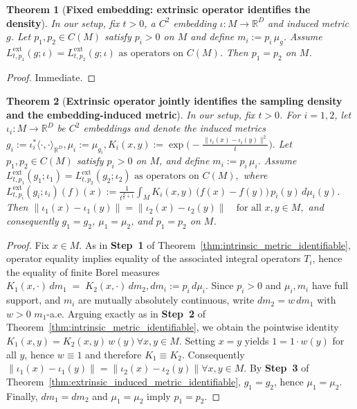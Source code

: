 \documentclass{amsart}
\newtheorem{theorem}{Theorem}[section]
\theoremstyle{definition}
\theoremstyle{remark}
\newcommand{\0}{\boldsymbol{0}}
\begin{document}
\begin{theorem}[\textbf{Fixed embedding: extrinsic operator identifies the density}]
\label{thm:extrinsic_fixed_embedding_identifies_density}
In our setup, fix $t>0$, a $C^2$ embedding $\iota:M\to\mathbb{R}^{D}$ and induced metric $g$.
Let $p_1,p_2\in C(M)$ satisfy $p_i>0$ on $M$ and define $m_i:=p_i\,\mu_g$.
Assume
\(
L^{\mathrm{ext}}_{t,p_1}(g;\iota)=L^{\mathrm{ext}}_{t,p_2}(g;\iota)
\text{ as operators on }C(M)
\). Then $p_1=p_2$ on $M$.
\end{theorem}

\begin{proof}
Immediate.
\end{proof}



\begin{theorem}[\textbf{Extrinsic operator jointly identifies the sampling density and the embedding-induced metric}]
\label{thm:extrinsic_joint_identifies_metric_and_density}
In our setup, fix $t>0$. For $i=1,2$, let $\iota_i:M\to\mathbb{R}^{D}$ be $C^2$ embeddings and denote the induced metrics
\(
g_i:=\iota_i^*\langle\cdot,\cdot\rangle_{\mathbb{R}^{D}},
 \mu_i:=\mu_{g_i},
 K_i(x,y):=\exp\!\Big(-\frac{\|\iota_i(x)-\iota_i(y)\|^2}{t}\Big).
\)
Let $p_1,p_2\in C(M)$ satisfy $p_i>0$ on $M$, and define $m_i:=p_i\,\mu_i$.
Assume
\(
L^{\mathrm{ext}}_{t,p_1}(g_1;\iota_1)=L^{\mathrm{ext}}_{t,p_2}(g_2;\iota_2)
\text{ as operators on }C(M),
\)
where
\(
L^{\mathrm{ext}}_{t,p_i}(g_i;\iota_i)(f)(x)
:=\frac{1}{t^{\frac d2+1}}\int_M K_i(x,y)\,\bigl(f(x)-f(y)\bigr)\,p_i(y)\,d\mu_i(y).
\)
Then
\(
\|\iota_1(x)-\iota_1(y)\|=\|\iota_2(x)-\iota_2(y)\|
\quad\text{for all }x,y\in M,
\)
and consequently $g_1=g_2$, $\mu_1=\mu_2$, and $p_1=p_2$ on $M$.
\end{theorem}

\begin{proof}
Fix $x\in M$. As in \textbf{Step~1} of Theorem~\ref{thm:intrinsic_metric_identifiable}, operator equality implies equality of the associated
integral operators $T_i$, hence the equality of finite Borel measures
\(
K_1(x,\cdot)\,dm_1 \;=\; K_2(x,\cdot)\,dm_2,
 dm_i:=p_i\,d\mu_i .
\)
Since $p_i>0$ and $\mu_i, m_i$ have full support, and $m_i$ are mutually absolutely continuous, write $dm_2=w\,dm_1$ with $w>0$ $m_1$-a.e.
Arguing exactly as in \textbf{Step~2} of Theorem~\ref{thm:intrinsic_metric_identifiable},
we obtain the pointwise identity
\(
K_1(x,y)=K_2(x,y)\,w(y) \forall x,y\in M.
\)
Setting $x=y$ yields $1=1\cdot w(y)$ for all $y$, hence $w\equiv 1$ and therefore $K_1\equiv K_2$. Consequently
\(
\|\iota_1(x)-\iota_1(y)\|=\|\iota_2(x)-\iota_2(y)\|\forall x,y\in M.
\)
By \textbf{Step~3} of Theorem~\ref{thm:extrinsic_induced_metric_identifiable}, $g_1=g_2$, hence $\mu_1=\mu_2$.
Finally, $dm_1=dm_2$ and $\mu_1=\mu_2$ imply $p_1=p_2$.
\end{proof}




%
%
\end{document}

